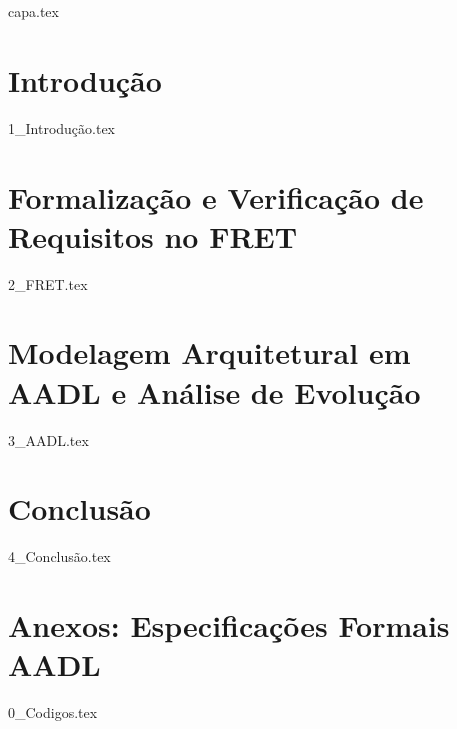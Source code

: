 \documentclass[
    a4paper,        %
    12pt,           %
    openany,        %
    oneside         %
]{article}
\begin{document}

{capa.tex}


{\hypersetup{linkcolor=black} %
\tableofcontents   %
\clearpage}

\section{Introdução}                 \label{sec:introducao}
{1_Introdução.tex}
\clearpage

\section{Formalização e Verificação de Requisitos no FRET} \label{sec:fret}
{2_FRET.tex}
\clearpage

\section{Modelagem Arquitetural em AADL e Análise de Evolução} \label{sec:aadl}
{3_AADL.tex}
\clearpage

\section{Conclusão}                 \label{sec:conclusao}
{4_Conclusão.tex}
\clearpage

\clearpage
\section*{Anexos: Especificações Formais AADL}
{0_Codigos.tex}
\pagebreak




\end{document}
